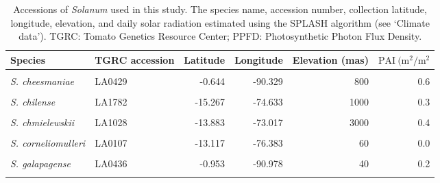 \documentclass[
  letterpaper,
  DIV=11,
  numbers=noendperiod]{scrartcl}
\begin{document}
\begin{longtable}{>{\raggedright\arraybackslash}p{3.25cm}lrrrr}

\caption{\label{tbl-accessions}Accessions of \emph{Solanum} used in this
study. The species name, accession number, collection latitude,
longitude, elevation, and daily solar radiation estimated using the
SPLASH algorithm (see `Climate data'). TGRC: Tomato Genetics Resource
Center; PPFD: Photosynthetic Photon Flux Density.}

\tabularnewline

\toprule
Species & TGRC accession & Latitude & Longitude & Elevation (mas) & $\mathrm{PAI}~(\unit{\meter\squared\per\meter\squared}$\\
\midrule
\em{\cellcolor{gray!10}{S. arcanum}} & \cellcolor{gray!10}{LA2172} & \cellcolor{gray!10}{-6.008} & \cellcolor{gray!10}{-78.858} & \cellcolor{gray!10}{662} & \cellcolor{gray!10}{0.7}\\
\em{S. cheesmaniae} & LA0429 & -0.644 & -90.329 & 800 & 0.6\\
\em{\cellcolor{gray!10}{S. cheesmaniae}} & \cellcolor{gray!10}{LA3124} & \cellcolor{gray!10}{-0.804} & \cellcolor{gray!10}{-90.042} & \cellcolor{gray!10}{1} & \cellcolor{gray!10}{0.4}\\
\em{S. chilense} & LA1782 & -15.267 & -74.633 & 1000 & 0.3\\
\em{\cellcolor{gray!10}{S. chilense}} & \cellcolor{gray!10}{LA4117A} & \cellcolor{gray!10}{-22.907} & \cellcolor{gray!10}{-67.941} & \cellcolor{gray!10}{3540} & \cellcolor{gray!10}{0.2}\\
\addlinespace
\em{S. chmielewskii} & LA1028 & -13.883 & -73.017 & 3000 & 0.4\\
\em{\cellcolor{gray!10}{S. chmielewskii}} & \cellcolor{gray!10}{LA1316} & \cellcolor{gray!10}{-13.400} & \cellcolor{gray!10}{-73.906} & \cellcolor{gray!10}{2920} & \cellcolor{gray!10}{1.1}\\
\em{S. corneliomulleri} & LA0107 & -13.117 & -76.383 & 60 & 0.0\\
\em{\cellcolor{gray!10}{S. corneliomulleri}} & \cellcolor{gray!10}{LA0444} & \cellcolor{gray!10}{-13.433} & \cellcolor{gray!10}{-76.133} & \cellcolor{gray!10}{100} & \cellcolor{gray!10}{0.5}\\
\em{S. galapagense} & LA0436 & -0.953 & -90.978 & 40 & 0.2\\
\addlinespace
\em{\cellcolor{gray!10}{S. galapagense}} & \cellcolor{gray!10}{LA1044} & \cellcolor{gray!10}{-0.284} & \cellcolor{gray!10}{-90.548} & \cellcolor{gray!10}{0} & \cellcolor{gray!10}{0.2}\\

\end{longtable}
\end{document}
